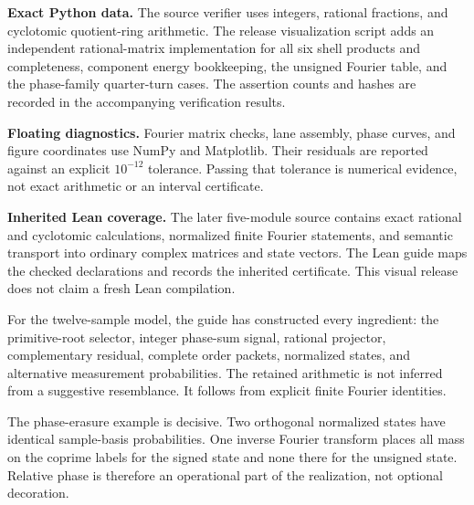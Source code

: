 \textbf{Exact Python data.} The source verifier uses integers, rational fractions, and cyclotomic quotient-ring arithmetic. The release visualization script adds an independent rational-matrix implementation for all six shell products and completeness, component energy bookkeeping, the unsigned Fourier table, and the phase-family quarter-turn cases. The assertion counts and hashes are recorded in the accompanying verification results.

\textbf{Floating diagnostics.} Fourier matrix checks, lane assembly, phase curves, and figure coordinates use NumPy and Matplotlib. Their residuals are reported against an explicit $10^{-12}$ tolerance. Passing that tolerance is numerical evidence, not exact arithmetic or an interval certificate.

\textbf{Inherited Lean coverage.} The later five-module source contains exact rational and cyclotomic calculations, normalized finite Fourier statements, and semantic transport into ordinary complex matrices and state vectors. The Lean guide maps the checked declarations and records the inherited certificate. This visual release does not claim a fresh Lean compilation.


For the twelve-sample model, the guide has constructed every ingredient: the primitive-root selector, integer phase-sum signal, rational projector, complementary residual, complete order packets, normalized states, and alternative measurement probabilities. The retained arithmetic is not inferred from a suggestive resemblance. It follows from explicit finite Fourier identities.

The phase-erasure example is decisive. Two orthogonal normalized states have identical sample-basis probabilities. One inverse Fourier transform places all mass on the coprime labels for the signed state and none there for the unsigned state. Relative phase is therefore an operational part of the realization, not optional decoration.

